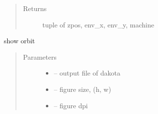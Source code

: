 \documentclass[letterpaper,10pt,english]{sphinxmanual}
\begin{document}
\begin{fulllineitems}
\begin{fulllineitems}
\begin{quote}
\begin{description}
\item[{Returns}] \leavevmode
tuple of zpos, env\_x, env\_y, machine

\end{description}\end{quote}

\end{fulllineitems}


\begin{fulllineitems}
\label{\detokenize{src/apidocs/genopt:genopt.DakotaOC.hcors}}
\end{fulllineitems}


\begin{fulllineitems}
\label{\detokenize{src/apidocs/genopt:genopt.DakotaOC.latfile}}
\end{fulllineitems}


\begin{fulllineitems}
\label{\detokenize{src/apidocs/genopt:genopt.DakotaOC.optdriver}}
\end{fulllineitems}


\begin{fulllineitems}
\label{\detokenize{src/apidocs/genopt:genopt.DakotaOC.plot}}
show orbit
\begin{quote}\begin{description}
\item[{Parameters}] \leavevmode\begin{itemize}
\item {} 
 -- output file of dakota

\item {} 
 -- figure size, (h, w)

\item {} 
 -- figure dpi

\end{itemize}

\end{description}\end{quote}


\end{fulllineitems}
\end{fulllineitems}
\end{document}
